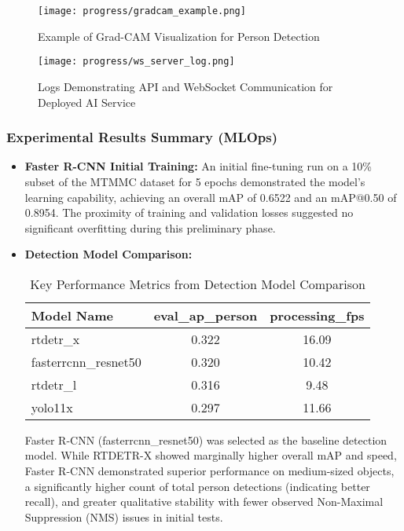\begin{figure}[!htb]
    \centering
    \texttt{[image: progress/gradcam\_example.png]}
    \caption{Example of Grad-CAM Visualization for Person Detection}
    \label{fig:progress_gradcam_example}
\end{figure}

\begin{figure}[!htb]
    \centering
    \texttt{[image: progress/ws\_server\_log.png]}
    \caption{Logs Demonstrating API and WebSocket Communication for Deployed AI Service}
    \label{fig:progress_api_logs}
\end{figure}
\clearpage

\subsubsection*{Experimental Results Summary (MLOps)}
\begin{itemize}
    \item \textbf{Faster R-CNN Initial Training:} An initial fine-tuning run on a 10\% subset of the MTMMC dataset for 5 epochs demonstrated the model's learning capability, achieving an overall mAP of 0.6522 and an mAP@0.50 of 0.8954. The proximity of training and validation losses suggested no significant overfitting during this preliminary phase.
    \item \textbf{Detection Model Comparison:}
        \begin{table}[!htb]
          \centering
          \caption{Key Performance Metrics from Detection Model Comparison}
          \label{tab:progress_model_comparison_summary}
          \begin{tabular}{@{}lcc@{}}
            \toprule
            Model Name & eval\_ap\_person & processing\_fps \\ \midrule
            {rtdetr\_x} & 0.322 & 16.09 \\
            {fasterrcnn\_resnet50} & 0.320 & 10.42 \\
            {rtdetr\_l} & 0.316 & 9.48 \\
            {yolo11x} & 0.297 & 11.66 \\ \bottomrule
          \end{tabular}%
        \end{table}
    
        Faster R-CNN (fasterrcnn\_resnet50) was selected as the baseline detection model. While RTDETR-X showed marginally higher overall mAP and speed, Faster R-CNN demonstrated superior performance on medium-sized objects, a significantly higher count of total person detections (indicating better recall), and greater qualitative stability with fewer observed Non-Maximal Suppression (NMS) issues in initial tests.
\end{itemize}

